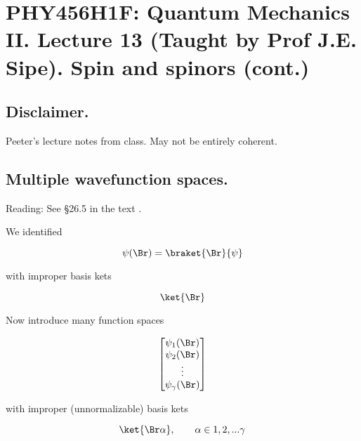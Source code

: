 
%

\chapter{PHY456H1F: Quantum Mechanics II.  Lecture 13 (Taught by Prof J.E. Sipe).  Spin and spinors (cont.)}
\label{chap:qmTwoL13}
{}
\date{Oct 24, 2011}

\beginArtWithToc

\section{Disclaimer.}

Peeter's lecture notes from class.  May not be entirely coherent.

\section{Multiple wavefunction spaces.}

Reading: See \S 26.5 in the text \cite{desai2009quantum}.

We identified 

\begin{equation}\label{eqn:qmTwoL13:10}
\psi(\Br) = \braket{ \Br}{\psi}
\end{equation}

with improper basis kets

\begin{equation}\label{eqn:qmTwoL13:30}
\ket{\Br}
\end{equation}

Now introduce many function spaces

\begin{equation}\label{eqn:qmTwoL13:50}
\begin{bmatrix}
\psi_1(\Br) \\
\psi_2(\Br) \\
\vdots \\
\psi_\gamma(\Br)
\end{bmatrix}
\end{equation}

with improper (unnormalizable) basis kets

\begin{equation}\label{eqn:qmTwoL13:70}
\ket{\Br \alpha}, \qquad \alpha \in 1, 2, ... \gamma
\end{equation}

